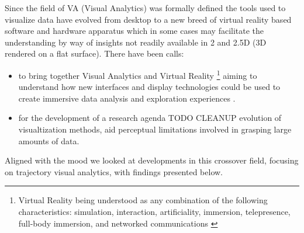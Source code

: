 Since the field of VA (Visual Analytics) was formally defined \cite{Fisher:2005} \cite{KOHLHAMMER2011117} the tools used to visualize data have evolved from desktop to a new breed of virtual reality based software and hardware apparatus which in some cases may facilitate the understanding by way of insights not readily available in 2 and 2.5D (3D rendered on a flat surface). There have been calls:
\begin{itemize}
\item to bring together Visual Analytics and Virtual Reality \footnote{Virtual Reality being understood as any combination of the
following characteristics: simulation, interaction,
artificiality, immersion, telepresence, full-body immersion,
and networked communications \cite{HEIM:1994}} aiming to understand how new interfaces and display technologies could be used to create immersive data analysis and exploration experiences \cite{Bach:2016:IAE:2992154.2996365} \cite{May:1667670}.

\item for the development of a research agenda TODO CLEANUP evolution of visualtization methods, aid perceptual limitations involved in grasping large amounts of data.\cite{Olshannikova2015}
\end{itemize}

Aligned with the mood we looked at developments in this crossover field, focusing on trajectory visual analytics, with findings presented below.